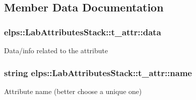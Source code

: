\subsection{Member Data Documentation}
\hypertarget{structelps_1_1_lab_attributes_stack_1_1t__attr_a40f2a6b918faf72d03a62ce77e3a017c}{
\subsubsection[{data}]{ elps\-::\-Lab\-Attributes\-Stack\-::t\-\_\-attr\-::data}}\label{structelps_1_1_lab_attributes_stack_1_1t__attr_a40f2a6b918faf72d03a62ce77e3a017c}
Data/info related to the attribute \hypertarget{structelps_1_1_lab_attributes_stack_1_1t__attr_a6081ff65525e6e2895c72903da219803}{
\subsubsection[{name}]{\setlength{\rightskip}{0pt plus 5cm}string elps\-::\-Lab\-Attributes\-Stack\-::t\-\_\-attr\-::name}}\label{structelps_1_1_lab_attributes_stack_1_1t__attr_a6081ff65525e6e2895c72903da219803}
Attribute name (better choose a unique one) 